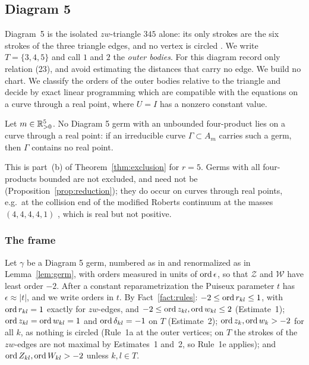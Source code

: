 \subsection{Diagram 5}\label{sec:d5}

Diagram~5 is the isolated $zw$-triangle $345$ alone: its only strokes are the six strokes of
the three triangle edges, and no vertex is circled \cite[\S7.4 and Fig.~11]{AK}.
We write $T=\{3,4,5\}$ and call $1$ and $2$ the \emph{outer bodies}.  For this diagram
\cite[\S\S8.4--8.5]{AK} record only relation (23), and \cite[\S9]{AK} avoid estimating the
distances that carry no edge.
We build no chart.  We classify the orders of the outer bodies relative to the triangle and
decide by exact linear programming which are compatible with the equations on a curve through
a real point, where $U=I$ has a nonzero constant value.

\begin{theorem}\label{thm:d5}
Let $m\in\mathbb{R}_{>0}^5$.  No Diagram 5 germ with an unbounded four-product lies on a curve through a
real point: if an irreducible curve $\Gamma\subset A_m$ carries such a germ, then $\Gamma$
contains no real point.
\end{theorem}

This is part~(b) of Theorem~\ref{thm:exclusion} for $r=5$.  Germs with all four-products bounded
are not excluded, and need not be (Proposition~\ref{prop:reduction}); they do occur on curves
through real points, e.g.\ at the collision end of the modified Roberts continuum at the masses
$(4,4,4,4,1)$ \cite[p.~543]{AK}, which is real but not positive.

\subsubsection{The frame}\label{d5-frame}
Let $\gamma$ be a Diagram 5 germ, numbered as in \cite[Fig.~11]{AK} and renormalized as in
Lemma~\ref{lem:germ}, with orders measured in units of $\operatorname{ord}\epsilon$, so that $\mathcal Z$ and
$\mathcal W$ have least order $-2$.  After a constant reparametrization the Puiseux parameter
$t$ has $\epsilon\approx|t|$, and we write orders in $t$.
By Fact~\ref{fact:rules}: $-2\le\operatorname{ord} r_{kl}\le1$, with $\operatorname{ord} r_{kl}=1$ exactly for $zw$-edges, and
$-2\le\operatorname{ord} z_{kl},\operatorname{ord} w_{kl}\le2$ (Estimate~1); $\operatorname{ord} z_{kl}=\operatorname{ord} w_{kl}=1$ and
$\operatorname{ord}\delta_{kl}=-1$ on $T$ (Estimate~2); $\operatorname{ord} z_k,\operatorname{ord} w_k>-2$ for all $k$, as nothing is circled
(Rule~1a at the outer vertices; on $T$ the strokes of the $zw$-edges are not maximal by
Estimates~1 and~2, so Rule~1e applies); and $\operatorname{ord} Z_{kl},\operatorname{ord} W_{kl}>-2$
unless $k,l\in T$.

